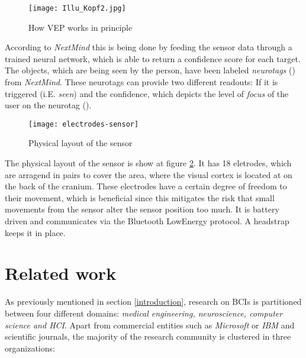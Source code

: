             \begin{figure}[h]     %
                \centering
                \texttt{[image: Illu\_Kopf2.jpg]} 
                \caption{How VEP works in principle}\label{vep-principle}
            \end{figure}            
            
            According to \textit{NextMind} this is being done by feeding the sensor data through a trained neural network, which is able to return a confidence score for each target. The objects, which are being seen by the person, have been labeled \textit{neurotags} (\cite{NextMind.23112020}) from \textit{NextMind}. These neurotags can provide two different readouts: If it is triggered (i.E. \textit{seen}) and the confidence, which depicts the level of \textit{focus} of the user on the neurotag (\cite{NextMind.18112020}).
            
            \begin{figure}[h]     %
                \centering
                \texttt{[image: electrodes-sensor]} 
                \caption{Physical layout of the sensor}\label{electrodes-sensor}
            \end{figure}
            
            The physical layout of the sensor is show at figure \ref*{electrodes-sensor}. It has 18 eletrodes, which are arragend in pairs to cover the area, where the visual cortex is located at on the back of the cranium. These electrodes have a certain degree of freedom to their movement, which is beneficial since this mitigates the risk that small movements from the sensor alter the sensor position too much. It is battery driven and communicates via the Bluetooth LowEnergy protocol. A headstrap keeps it in place.

        \section{Related work}\label{related-work}

            As previously mentioned in section \ref*{introduction}, research on BCIs is partitioned between four different domains: \textit{medical engineering, neuroscience, computer science and HCI}. Apart from commercial entities such as \textit{Microsoft} or \textit{IBM} and scientific journals, the majority of the research community is clustered in three organizations: 

